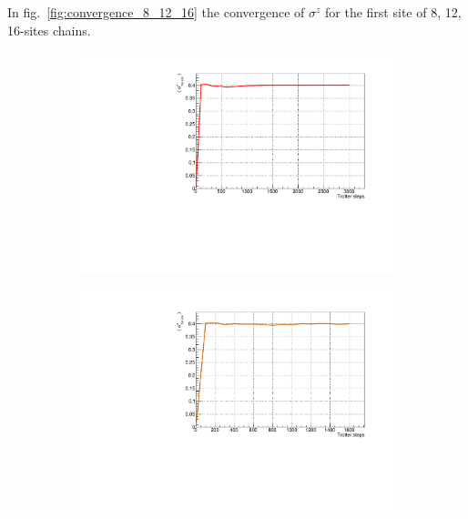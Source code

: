 In fig.~\ref{fig:convergence_8_12_16} the convergence of $\sigma^z$ for the first site of 8, 12, 16-sites chains. 

\begin{figure}[H]
\centering
\begin{subfigure}{\columnwidth}
\centering
    \includegraphics[scale=0.6]{Figures/convergence/Convergence_s8T3000J1051.pdf}
    \label{fig:8sites_LMvsGamma}
\end{subfigure}\quad
\begin{subfigure}{\columnwidth}
\centering
    \includegraphics[scale=0.6]{Figures/convergence/Convergence_LM_L012_m060_Time001600_J1051.pdf}
    \label{fig:12sites_LMvsGamma}
\end{subfigure}\\
\begin{subfigure}{\columnwidth}

\end{subfigure}
\end{figure}
